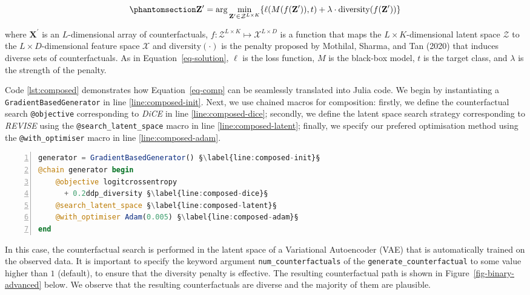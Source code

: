\documentclass{juliacon}
\begin{document}
\begin{equation}\phantomsection\label{eq-comp}{
\mathbf{Z}^\prime = \arg \min_{\mathbf{Z}^\prime \in \mathcal{Z}^{L \times K}} \{  {\ell(M(f(\mathbf{Z}^\prime)),t)} + \lambda \cdot {\text{diversity}(f(\mathbf{Z}^\prime)) }  \} 
}\end{equation}

where \(\mathbf{X}^\prime\) is an \(L\)-dimensional array of
counterfactuals,
\(f: \mathcal{Z}^{L \times K} \mapsto \mathcal{X}^{L \times D}\) is a
function that maps the \(L \times K\)-dimensional latent space
\(\mathcal{Z}\) to the \(L \times D\)-dimensional feature space
\(\mathcal{X}\) and \(\text{diversity}(\cdot)\) is the penalty proposed
by Mothilal, Sharma, and Tan (2020) that induces diverse sets of
counterfactuals. As in Equation~\ref{eq-solution}, \(\ell\) is the loss
function, \(M\) is the black-box model, \(t\) is the target class, and
\(\lambda\) is the strength of the penalty.

Code \ref{lst:composed} demonstrates how Equation~\ref{eq-comp} can be
seamlessly translated into Julia code. We begin by instantiating a
\texttt{GradientBasedGenerator} in line \ref{line:composed-init}. Next,
we use chained macros for composition: firstly, we define the
counterfactual search \texttt{@objective} corresponding to \emph{DiCE}
in line \ref{line:composed-dice}; secondly, we define the latent space
search strategy corresponding to \emph{REVISE} using the
\texttt{@search\_latent\_space} macro in line
\ref{line:composed-latent}; finally, we specify our prefered
optimisation method using the \texttt{@with\_optimiser} macro in line
\ref{line:composed-adam}.

\begin{lstlisting}[language=Julia, escapechar=§, numbers=left, label={lst:composed}, caption={Composing a custom generator.}]
generator = GradientBasedGenerator() §\label{line:composed-init}§
@chain generator begin
    @objective logitcrossentropy 
      + 0.2ddp_diversity §\label{line:composed-dice}§
    @search_latent_space §\label{line:composed-latent}§
    @with_optimiser Adam(0.005) §\label{line:composed-adam}§
end
\end{lstlisting}

In this case, the counterfactual search is performed in the latent space
of a Variational Autoencoder (VAE) that is automatically trained on the
observed data. It is important to specify the keyword argument
\texttt{num\_counterfactuals} of the \texttt{generate\_counterfactual}
to some value higher than \(1\) (default), to ensure that the diversity
penalty is effective. The resulting counterfactual path is shown in
Figure~\ref{fig-binary-advanced} below. We observe that the resulting
counterfactuals are diverse and the majority of them are plausible.
\end{document}
